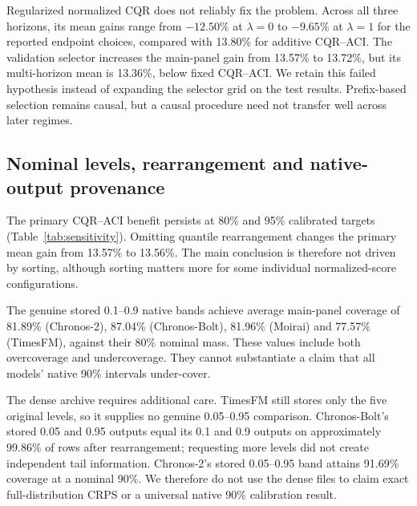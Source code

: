 \documentclass[preprint,11pt]{elsarticle}
\begin{document}
Regularized normalized CQR does not reliably fix the problem. Across all three horizons,
its mean gains range from $-12.50\%$ at $\lambda=0$ to $-9.65\%$ at $\lambda=1$ for the
reported endpoint choices, compared with 13.80\% for additive CQR--ACI. The validation
selector increases the main-panel gain from 13.57\% to 13.72\%, but its multi-horizon
mean is 13.36\%, below fixed CQR--ACI. We retain this failed hypothesis instead of
expanding the selector grid on the test results. Prefix-based selection remains causal,
but a causal procedure need not transfer well across later regimes.

\subsection{Nominal levels, rearrangement and native-output provenance}
The primary CQR--ACI benefit persists at 80\% and 95\% calibrated targets
(Table~\ref{tab:sensitivity}). Omitting quantile rearrangement changes the primary mean
gain from 13.57\% to 13.56\%. The main conclusion is therefore not driven by sorting,
although sorting matters more for some individual normalized-score configurations.

\begin{table}[htbp]\centering\small
\caption{CQR--ACI sensitivity, using default residual--ACI at the same nominal level as
the denominator. Dense archives are a repeated-output sensitivity, not new independent data.}
\label{tab:sensitivity}
\end{table}

The genuine stored 0.1--0.9 native bands achieve average main-panel coverage of 81.89\%
(Chronos-2), 87.04\% (Chronos-Bolt), 81.96\% (Moirai) and 77.57\% (TimesFM), against
their 80\% nominal mass. These values include both overcoverage and undercoverage.
They cannot substantiate a claim that all models' native 90\% intervals under-cover.

The dense archive requires additional care. TimesFM still stores only the five original
levels, so it supplies no genuine 0.05--0.95 comparison. Chronos-Bolt's stored 0.05 and
0.95 outputs equal its 0.1 and 0.9 outputs on approximately 99.86\% of rows after
rearrangement; requesting more levels did not create independent tail information.
Chronos-2's stored 0.05--0.95 band attains 91.69\% coverage at a nominal 90\%.
We therefore do not use the dense files to claim exact full-distribution CRPS or a
universal native 90\% calibration result.
\end{document}
